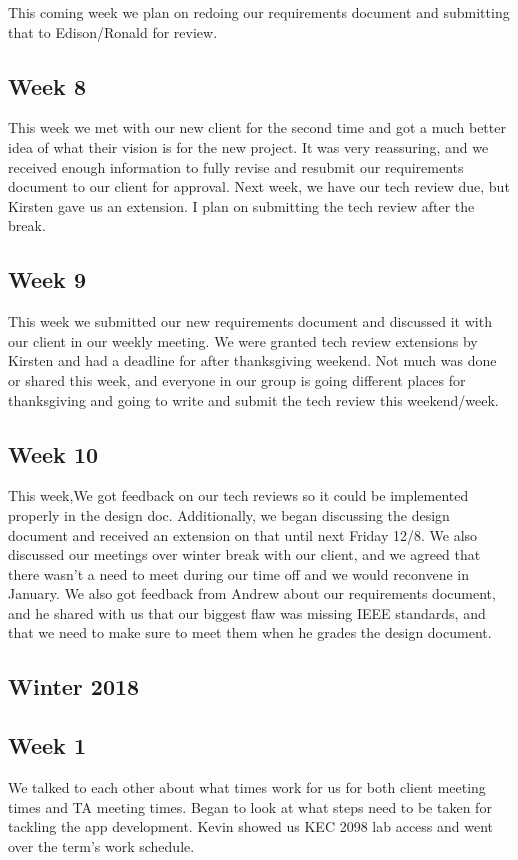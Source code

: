 \documentclass[onecolumn, draftclsnofoot,10pt, compsoc]{IEEEtran}
\begin{document}
        This coming week we plan on redoing our requirements document and submitting that to Edison/Ronald for review. 
    
    \subsection{Week 8}
        This week we met with our new client for the second time and got a much better idea of what their vision is for the new project. It was very reassuring, and we received enough information to fully revise and resubmit our requirements document to our client for approval. Next week, we have our tech review due, but Kirsten gave us an extension. I plan on submitting the tech review after the break. 

            
    \subsection{Week 9}
        This week we submitted our new requirements document and discussed it with our client in our weekly meeting. We were granted tech review extensions by Kirsten and had a deadline for after thanksgiving weekend. Not much was done or shared this week, and everyone in our group is going different places for thanksgiving and going to write and submit the tech review this weekend/week. 

            
            
    \subsection{Week 10}
        This week,We got feedback on our tech reviews so it could be implemented properly in the design doc. Additionally, we began discussing the design document and received an extension on that until next Friday 12/8. We also discussed our meetings over winter break with our client, and we agreed that there wasn't a need to meet during our time off and we would reconvene in January. We also got feedback from Andrew about our requirements document, and he shared with us that our biggest flaw was missing IEEE standards, and that we need to make sure to meet them when he grades the design document. 
        
        
\subsection{Winter 2018}
    \subsection{Week 1}
    We talked to each other about what times work for us for both client meeting times and TA meeting times. Began to look at what steps need to be taken for tackling the app development. Kevin showed us KEC 2098 lab access and went over the term's work schedule. 
    
\end{document}
